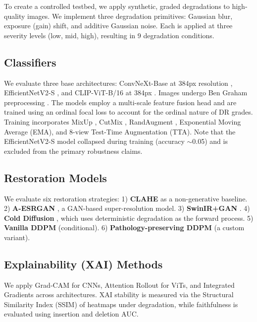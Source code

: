 \documentclass[conference]{IEEEtran}
\begin{document}
To create a controlled testbed, we apply synthetic, graded degradations to high-quality images. We implement three degradation primitives: Gaussian blur, exposure (gain) shift, and additive Gaussian noise. Each is applied at three severity levels (low, mid, high), resulting in 9 degradation conditions.

\subsection{Classifiers}
We evaluate three base architectures: ConvNeXt-Base at 384px resolution \cite{liu2022convnext}, EfficientNetV2-S \cite{tan2021efficientnetv2}, and CLIP-ViT-B/16 at 384px \cite{radford2021clip}. Images undergo Ben Graham preprocessing \cite{graham2015kaggle}. The models employ a multi-scale feature fusion head and are trained using an ordinal focal loss \cite{lin2017focal} to account for the ordinal nature of DR grades. Training incorporates MixUp \cite{zhang2018mixup}, CutMix \cite{yun2019cutmix}, RandAugment \cite{cubuk2020randaugment}, Exponential Moving Average (EMA), and 8-view Test-Time Augmentation (TTA). Note that the EfficientNetV2-S model collapsed during training (accuracy $\sim$0.05) and is excluded from the primary robustness claims.

\subsection{Restoration Models}
We evaluate six restoration strategies:
1) \textbf{CLAHE} \cite{pizer1987clahe} as a non-generative baseline.
2) \textbf{A-ESRGAN} \cite{wei2021aesrgan}, a GAN-based super-resolution model.
3) \textbf{SwinIR+GAN} \cite{liang2021swinir}.
4) \textbf{Cold Diffusion} \cite{bansal2022colddiffusion}, which uses deterministic degradation as the forward process.
5) \textbf{Vanilla DDPM} \cite{ho2020ddpm} (conditional).
6) \textbf{Pathology-preserving DDPM} (a custom variant).

\subsection{Explainability (XAI) Methods}
We apply Grad-CAM \cite{selvaraju2017gradcam} for CNNs, Attention Rollout \cite{abnar2020rollout} for ViTs, and Integrated Gradients \cite{sundararajan2017ig} across architectures. XAI stability is measured via the Structural Similarity Index (SSIM) of heatmaps under degradation, while faithfulness is evaluated using insertion and deletion AUC.
\end{document}
